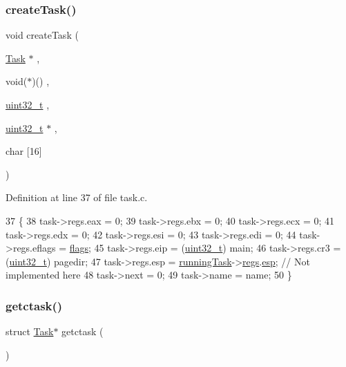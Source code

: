 \subsubsection{\texorpdfstring{create\+Task()}{createTask()}}
{\footnotesize\ttfamily void create\+Task (\begin{DoxyParamCaption}\item[{\hyperlink{a00136}{Task} $\ast$}]{,  }\item[{void($\ast$)()}]{,  }\item[{\hyperlink{a00095_a435d1572bf3f880d55459d9805097f62_a435d1572bf3f880d55459d9805097f62}{uint32\+\_\+t}}]{,  }\item[{\hyperlink{a00095_a435d1572bf3f880d55459d9805097f62_a435d1572bf3f880d55459d9805097f62}{uint32\+\_\+t} $\ast$}]{,  }\item[{char}]{\mbox{[}16\mbox{]} }\end{DoxyParamCaption})}



Definition at line 37 of file task.\+c.


\begin{DoxyCode}
37                                                                                               \{
38     task->regs.eax = 0;
39     task->regs.ebx = 0;
40     task->regs.ecx = 0;
41     task->regs.edx = 0;
42     task->regs.esi = 0;
43     task->regs.edi = 0;
44     task->regs.eflags = \hyperlink{a00068_aa2585d779da0ab21273a8d92de9a0ebe_aa2585d779da0ab21273a8d92de9a0ebe}{flags};
45     task->regs.eip = (\hyperlink{a00095_a435d1572bf3f880d55459d9805097f62_a435d1572bf3f880d55459d9805097f62}{uint32\_t}) main;
46     task->regs.cr3 = (\hyperlink{a00095_a435d1572bf3f880d55459d9805097f62_a435d1572bf3f880d55459d9805097f62}{uint32\_t}) pagedir;
47     task->regs.esp = \hyperlink{a00047_a2c195d425b4a6791b3a89f7b219f93d9_a2c195d425b4a6791b3a89f7b219f93d9}{runningTask}->\hyperlink{a00136_a136b243ee52ff89e9ba97f4e4dba19bb_a136b243ee52ff89e9ba97f4e4dba19bb}{regs}.\hyperlink{a00132_aca352215ac1e37f833da4f6289392261_aca352215ac1e37f833da4f6289392261}{esp}; \textcolor{comment}{// Not implemented here}
48     task->next = 0;
49     task->name = name;
50 \}
\end{DoxyCode}
\mbox{\label{a00050_a5913e9b2190b2b4118ee020721a320e2_a5913e9b2190b2b4118ee020721a320e2}} 
\subsubsection{\texorpdfstring{getctask()}{getctask()}}
{\footnotesize\ttfamily struct \hyperlink{a00136}{Task}$\ast$ getctask (\begin{DoxyParamCaption}{ }\end{DoxyParamCaption})}



